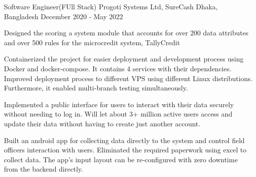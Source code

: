 \cventry
    {Software Engineer(FUll Stack)}
    {Progoti Systems Ltd, SureCash}
    {Dhaka, Bangladesh}
    {December 2020 ‐ May 2022}
    {
      \begin{cvitems}
        \item {Designed the scoring a system module that accounts for over 200 data attributes and over 500 rules for the microcredit system, TallyCredit}
        \item {Containerized the project for easier deployment and development process using Docker and docker‑compose. It contains 4 services with their dependencies. Improved deployment process to different VPS using different Linux distributions. Furthermore, it enabled multi‑branch testing simultaneously.}
        \item {Implemented a public interface for users to interact with their data securely without needing to log in. Will let about 3+ million active users access and update their data without having to create just another account.}
        \item {Built an android app for collecting data directly to the system and control field officers interaction with users. Eliminated the required paperwork using excel to collect data. The app’s input layout can be re‑configured with zero downtime from the backend directly.}
      \end{cvitems}
    }